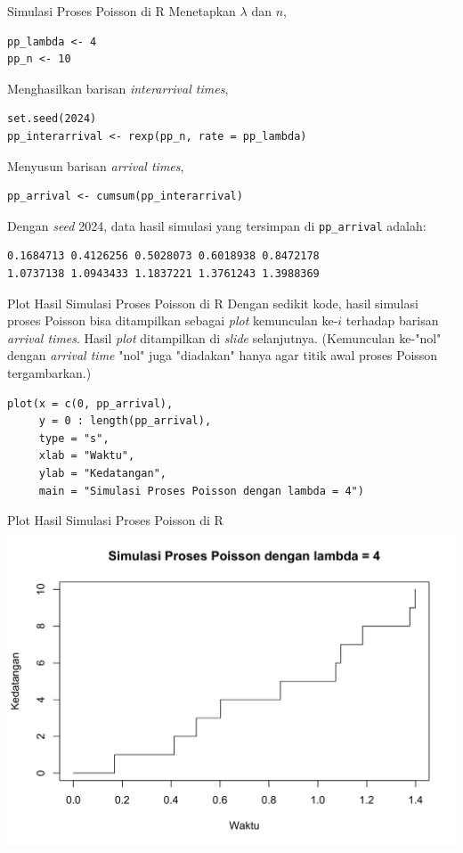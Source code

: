 \documentclass{beamer}
\begin{document}
\begin{frame}[fragile]{Simulasi Proses Poisson di R}
    Menetapkan \(\lambda\) dan \(n\),
\begin{verbatim}
pp_lambda <- 4
pp_n <- 10
\end{verbatim}
    Menghasilkan barisan \textit{interarrival times},
\begin{verbatim}
set.seed(2024)
pp_interarrival <- rexp(pp_n, rate = pp_lambda)
\end{verbatim}
    Menyusun barisan \textit{arrival times},
\begin{verbatim}
pp_arrival <- cumsum(pp_interarrival)    
\end{verbatim}
    Dengan \textit{seed} 2024, data hasil simulasi yang tersimpan di \verb|pp_arrival| adalah:
\begin{verbatim}
0.1684713 0.4126256 0.5028073 0.6018938 0.8472178
1.0737138 1.0943433 1.1837221 1.3761243 1.3988369
\end{verbatim}
\end{frame}

\begin{frame}[fragile]{Plot Hasil Simulasi Proses Poisson di R}
    Dengan sedikit kode, hasil simulasi proses Poisson bisa ditampilkan sebagai \textit{plot} kemunculan ke-\(i\) terhadap barisan \textit{arrival times}. Hasil \textit{plot} ditampilkan di \textit{slide} selanjutnya. (Kemunculan ke-"nol" dengan \textit{arrival time} "nol" juga "diadakan" hanya agar titik awal proses Poisson tergambarkan.)
\begin{verbatim}
plot(x = c(0, pp_arrival),
     y = 0 : length(pp_arrival),
     type = "s",
     xlab = "Waktu",
     ylab = "Kedatangan",
     main = "Simulasi Proses Poisson dengan lambda = 4")
\end{verbatim}
\end{frame}

\begin{frame}{Plot Hasil Simulasi Proses Poisson di R}
    \includegraphics[scale=0.65]{gambar/proc_pois_lambda4_sim.png}
\end{frame}
\end{document}
